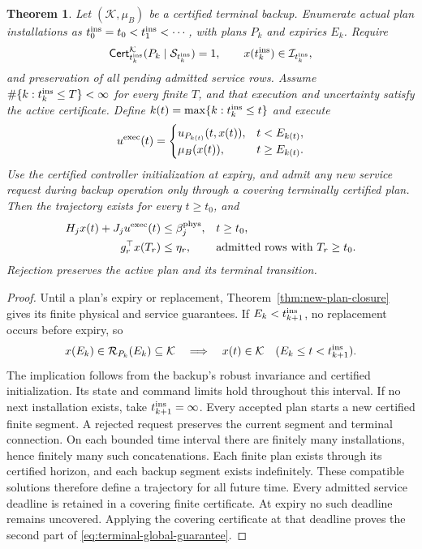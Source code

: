 \documentclass[preprint,12pt]{elsarticle}
\newtheorem{theorem}{Theorem}
\begin{document}
\begin{theorem}
\label{thm:backup-recursive-availability}
Let $(\mathcal K,\mu_B)$ be a certified terminal backup. Enumerate
actual plan installations as $t_0^{\rm ins}=t_0<t_1^{\rm ins}<\cdots$,
with plans $P_k$ and expiries $E_k$. Require
\[
\mathsf{Cert}^{\mathcal K}_{t_k^{\rm ins}}
 (P_k\mid\mathcal S_{t_k^{\rm ins}})=1,\qquad
x(t_k^{\rm ins})\in\mathcal I_{t_k^{\rm ins}},
\]
and preservation of all pending admitted service rows.
Assume $\#\{k:t_k^{\rm ins}\le T\}<\infty$ for every finite $T$, and
that execution and uncertainty satisfy the active certificate. Define
$k(t)=\max\{k:t_k^{\rm ins}\le t\}$ and execute
\begin{equation}
u^{\rm exec}(t)=\begin{cases}
u_{P_{k(t)}}(t,x(t)),&t<E_{k(t)},\\
\mu_B(x(t)),&t\ge E_{k(t)}.
\end{cases}
\label{eq:terminal-execution-policy}
\end{equation}
Use the certified controller initialization at expiry, and admit any new
service request during backup operation only through a covering terminally
certified plan. Then the trajectory exists for every $t\ge t_0$, and
\begin{equation}
\begin{aligned}
H_jx(t)+J_ju^{\rm exec}(t)&\le\beta_j^{\rm phys},
 &&t\ge t_0,\\
g_r^\top x(T_r)&\le\eta_r,
 &&\text{admitted rows with }T_r\ge t_0.
\end{aligned}
\label{eq:terminal-global-guarantee}
\end{equation}
Rejection preserves the active plan and its terminal transition.
\end{theorem}

\begin{proof}
Until a plan's expiry or replacement, Theorem~\ref{thm:new-plan-closure}
gives its finite physical and service guarantees. If
$E_k<t_{k+1}^{\rm ins}$, no replacement occurs before expiry, so
\[
x(E_k)\in\mathcal R_{P_k}(E_k)\subseteq\mathcal K
\quad\Longrightarrow\quad
x(t)\in\mathcal K\quad(E_k\le t<t_{k+1}^{\rm ins}).
\]
The implication follows from the backup's robust invariance and certified
initialization. Its state and command limits hold throughout this interval.
If no next installation exists, take $t_{k+1}^{\rm ins}=\infty$.
Every accepted plan starts a new certified finite segment. A rejected
request preserves the current segment and terminal connection. On each
bounded time interval there are finitely many installations, hence finitely
many such concatenations. Each finite plan exists through its certified
horizon, and each backup segment exists indefinitely. These compatible
solutions therefore define a trajectory for all future time. Every
admitted service deadline is retained in a covering finite certificate.
At expiry no such deadline remains uncovered. Applying the covering
certificate at that deadline proves the second part of
\eqref{eq:terminal-global-guarantee}.
\end{proof}
\end{document}
